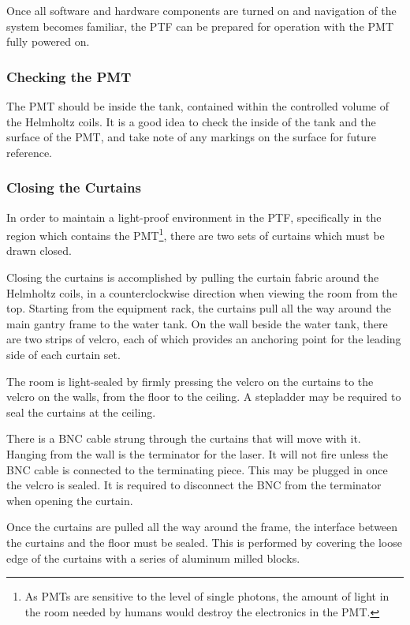 \documentclass[twoside,letterpaper]{refart}
\begin{document}
Once all software and hardware components are turned on and navigation of the system becomes familiar, the PTF can be prepared for operation with the PMT fully powered on.

\subsubsection{Checking the PMT}

The PMT should be inside the tank, contained within the controlled volume of the Helmholtz coils. It is a good idea to check the inside of the tank and the surface of the PMT, and take note of any markings on the surface for future reference.

\subsubsection{Closing the Curtains}

In order to maintain a light-proof environment in the PTF, specifically in the region which contains the PMT\footnote{As PMTs are sensitive to the level of single photons, the amount of light in the room needed by humans would destroy the electronics in the PMT.}, there are two sets of curtains which must be drawn closed.

Closing the curtains is accomplished by pulling the curtain fabric around the Helmholtz coils, in a counterclockwise direction when viewing the room from the top. Starting from the equipment rack, the curtains pull all the way around the main gantry frame to the water tank. On the wall beside the water tank, there are two strips of velcro, each of which provides an anchoring point for the leading side of each curtain set.

The room is light-sealed by firmly pressing the velcro on the curtains to the velcro on the walls, from the floor to the ceiling. A stepladder may be required to seal the curtains at the ceiling.

There is a BNC cable strung through the curtains that will move with it. Hanging from the wall is the terminator for the laser. It will not fire unless the BNC cable is connected to the terminating piece. This may be plugged in once the velcro is sealed. It is required to disconnect the BNC from the terminator when opening the curtain.

Once the curtains are pulled all the way around the frame, the interface between the curtains and the floor must be sealed. This is performed by covering the loose edge of the curtains with a series of aluminum milled blocks.
\end{document}
